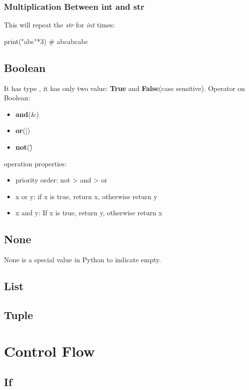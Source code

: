 \documentclass[10pt,a4paper,oneside]{article}
\begin{document}
\subsubsection{Multiplication Between int and str}
This will repeat the \textit{str} for \textit{int} times:
\begin{python}
	print("abc"*3)  # abcabcabc
\end{python}


\subsection{Boolean}
It has type , it has only two value: \textbf{True} and \textbf{False}(case sensitive). Operator on Boolean: 
\begin{itemize}
	\item \textbf{and}(\&)
	\item \textbf{or}(|)
	\item \textbf{not}(\^)
\end{itemize}
operation properties:
\begin{itemize}
	\item priority order: not > and > or
	\item x or y: if x is true, return x, otherwise return y
	\item x and y: If x is true, return y, otherwise return x
\end{itemize}

\subsection{None}
None is a special value in Python to indicate empty.

\subsection{List}

\subsection{Tuple}

\section{Control Flow}

\subsection{If}
\end{document}

